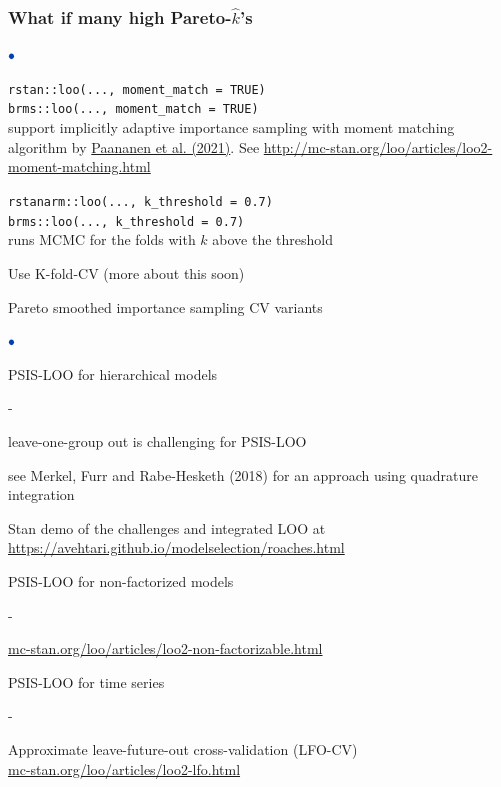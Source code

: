 \documentclass[english,t]{beamer}
\newenvironment{list1}{
   \begin{list}{$\color{list1}\bullet$}{\itemsep=6pt}}{
  \end{list}}
\newenvironment{list2}{
  \begin{list}{-}{\baselineskip=12pt\itemsep=2pt}}{
  \end{list}}
\begin{document}
\begin{frame}[fragile]
  \frametitle{What if many high Pareto-$\hat{k}$'s}

  \begin{list1}
  \item<+-> \texttt{rstan::loo(..., moment\_match = TRUE)}\\
    \texttt{brms::loo(..., moment\_match = TRUE)}\\
    support implicitly adaptive importance sampling with moment
    matching algorithm by
    \href{https://doi.org/10.1007/s11222-020-09982-2}{Paananen et al. (2021)}.  See \url{http://mc-stan.org/loo/articles/loo2-moment-matching.html}
  \item<+-> \texttt{rstanarm::loo(..., k\_threshold = 0.7)}\\
    \texttt{brms::loo(..., k\_threshold = 0.7)}\\
    runs MCMC for the folds with $\hat{k}$ above the threshold
  \item<+-> Use K-fold-CV (more about this soon)
  \end{list1}
  
\end{frame}

\begin{frame}{Pareto smoothed importance sampling CV variants}

\begin{list1}
\item PSIS-LOO for hierarchical models
  \begin{list2}
  \item leave-one-group out is challenging for PSIS-LOO\\ \vspace{0.2\baselineskip}
    
  \item {\small see Merkel, Furr and Rabe-Hesketh
      (2018) for an approach using quadrature integration}
  \item Stan demo of the challenges and integrated LOO at \url{https://avehtari.github.io/modelselection/roaches.html}
  \end{list2}
  \item<2-> PSIS-LOO for non-factorized models
    \begin{list2}
    \item {\url{mc-stan.org/loo/articles/loo2-non-factorizable.html}}
    \end{list2}
  \item<3-> PSIS-LOO for time series
  \begin{list2}
  \item Approximate leave-future-out cross-validation (LFO-CV) \\ \vspace{0.2\baselineskip}
    {\url{mc-stan.org/loo/articles/loo2-lfo.html}}
  \end{list2}
\end{list1}

\end{frame}
\end{document}

